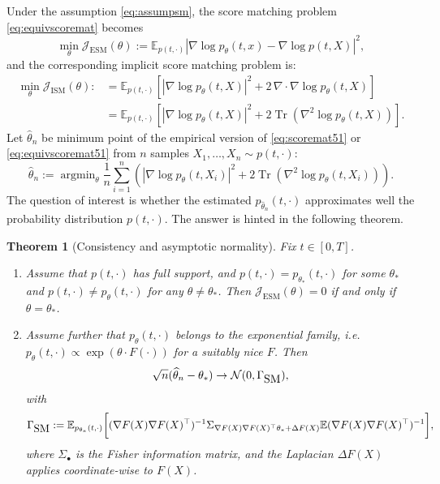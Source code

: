 \documentclass[letterpaper,11pt,reqno]{amsart}
\DeclareMathOperator\tr{Tr}
\DeclareMathOperator\argmin{\arg \min}
\newtheorem{theorem}{Theorem}[section]
\numberwithin{equation}{section}
\begin{document}
\quad Under the assumption \eqref{eq:assumpsm}, the score matching problem \eqref{eq:equivscoremat} becomes
\begin{equation}
\label{eq:scoremat51}
\min_\theta \mathcal{J}_{\text{ESM}}(\theta):=\mathbb{E}_{p(t, \cdot)} |\nabla \log p_\theta(t,x) - \nabla \log p(t,X)|^2,
\end{equation}
and the corresponding implicit score matching problem is:
\begin{equation}
\label{eq:equivscoremat51}
\begin{aligned}
\min_\theta \mathcal{J}_{\text{ISM}}(\theta):&= \mathbb{E}_{p(t, \cdot)} \left[ |\nabla \log p_\theta(t,X)|^2  + 2 \, \nabla \cdot \nabla \log p_\theta (t,X)\right] \\
& = \mathbb{E}_{p(t, \cdot)} \left[ |\nabla \log p_\theta(t,X)|^2  + 2 \tr (\nabla^2 \log p_\theta (t,X))\right].
\end{aligned}
\end{equation}
Let $\widehat{\theta}_n$ be minimum point of the empirical version
of \eqref{eq:scoremat51} or \eqref{eq:equivscoremat51} from $n$ samples $X_1, \ldots, X_n \sim p(t, \cdot)$:
\begin{equation}
\widehat{\theta}_n:= \argmin_\theta \frac{1}{n} \sum_{i = 1}^n \left( |\nabla \log p_\theta(t,X_i)|^2  + 2 \tr (\nabla^2 \log p_\theta (t,X_i) )\right).
\end{equation}
The question of interest is whether
the estimated $p_{\widehat{\theta}_n}(t, \cdot)$ approximates well 
the probability distribution $p(t, \cdot)$. 
The answer is hinted in the following theorem.
\begin{theorem}[Consistency and asymptotic normality]
\label{thm:cansm}
\cite{Hyv07, Koe22}
Fix $t \in [0,T]$.
\begin{enumerate}[itemsep = 3 pt]
\item
Assume that $p(t, \cdot)$ has full support, and 
$p(t, \cdot) = p_{\theta_*}(t, \cdot)$ for some $\theta_*$
and 
$p (t, \cdot) \ne p_\theta (t, \cdot)$ for any $\theta \ne \theta_*$.
Then $\mathcal{J}_{\text{ESM}}(\theta) = 0$ if and only if $\theta = \theta_*$.
\item
Assume further that $p_\theta(t, \cdot)$ belongs to the exponential family,
i.e.
$p_\theta(t, \cdot) \propto \exp(\theta \cdot F(\cdot))$ 
for a suitably nice $F$.
Then 
\begin{equation}
\label{eq:CVSM}
\sqrt{n} (\widehat{\theta}_n - \theta_*) \to \mathcal{N}(0, \Gamma_{\tiny \mbox{SM}}),
\end{equation}
with
\begin{multline*}
\Gamma_{\tiny \mbox{SM}}:= \mathbb{E}_{p_{\theta_*}(t, \cdot)} \bigg[(\nabla F(X) \nabla F(X)^\top)^{-1} \Sigma_{\nabla F(X) \nabla F(X)^\top \theta_* + \Delta F(X)} \mathbb{E}(\nabla F(X) \nabla F(X)^\top)^{-1}\bigg],
\end{multline*}
where 
$\Sigma_{\bullet}$ is the Fisher information matrix,
and the Laplacian $\Delta F(X)$ applies coordinate-wise to $F(X)$.
\end{enumerate}
\end{theorem}
\end{document}
